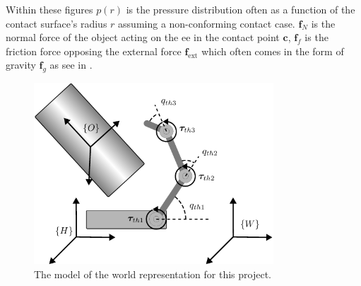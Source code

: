 \begin{center}
\begin{minipage}{.48\linewidth}
    \end{minipage}%
    \vspace{15pt}
    \begin{minipage}[t]{.48\linewidth}
        \vspace{0pt}
        \captionsetup{type=figure}
        \label{fig:friction-contact-distribution}
    \end{minipage}%
    \hfill%
    \begin{minipage}[t]{.48\linewidth}
        \vspace{0pt}
        \captionsetup{type=figure}
        \label{fig:force-closure-model}
    \end{minipage}%
\end{center}

Within these figures $p(r)$ is the pressure distribution often as a function of the contact surface's radius $r$ assuming a non-conforming contact case. $\mathbf{f}_N$ is the normal force of the object acting on the \gls{ee} in the contact point $\mathbf{c}$, $\mathbf{f}_f$ is the friction force opposing the external force $\mathbf{f}_{\text{ext}}$ which often comes in the form of gravity $\mathbf{f}_g$ as see in .


\begin{figure}[h]
	\begin{small}
		\begin{center}
			\includegraphics[width=0.8\textwidth]{chapters/modeling/fig/kinematic-tree-manipulator.pdf}
		\end{center}
		\caption{The model of the world representation for this project.}
		\label{fig:full-system-model}
	\end{small}
\end{figure}

